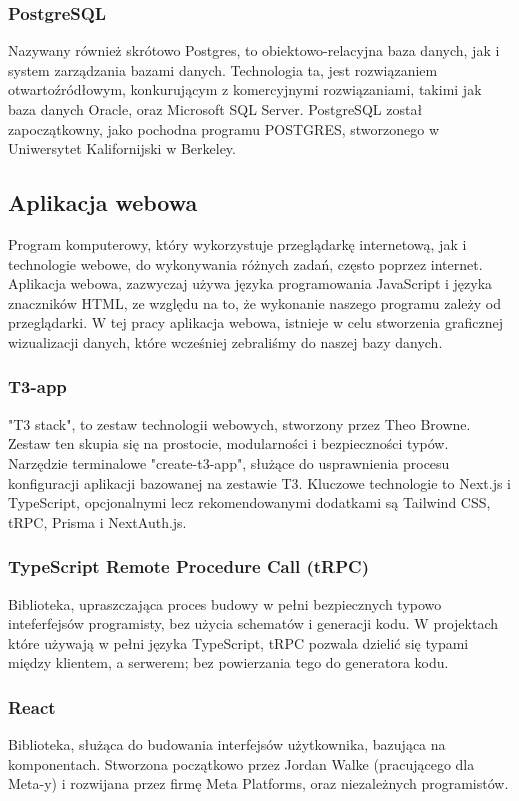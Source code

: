 \documentclass[a4paper, 12pt]{article}
\begin{document}
\subsubsection{PostgreSQL}
Nazywany również skrótowo Postgres, to obiektowo-relacyjna baza danych, jak i system zarządzania bazami danych. Technologia ta, jest rozwiązaniem otwartoźródłowym, konkurującym z komercyjnymi rozwiązaniami, takimi jak baza danych Oracle, oraz Microsoft SQL Server.\cite{postgresWhatis} PostgreSQL został zapoczątkowny, jako pochodna programu POSTGRES, stworzonego w Uniwersytet Kalifornijski w Berkeley.\cite{postgresHistory}
\subsection{Aplikacja webowa}
Program komputerowy, który wykorzystuje przeglądarkę internetową, jak i technologie webowe, do wykonywania różnych zadań, często poprzez internet. Aplikacja webowa, zazwyczaj używa języka programowania JavaScript i języka znaczników HTML, ze względu na to, że wykonanie naszego programu zależy od przeglądarki.\cite{stackpathWebapp} W tej pracy aplikacja webowa, istnieje w celu stworzenia graficznej wizualizacji danych, które wcześniej zebraliśmy do naszej bazy danych.
\subsubsection{T3-app}
"T3 stack", to zestaw technologii webowych, stworzony przez Theo Browne. Zestaw ten skupia się na prostocie, modularności i bezpieczności typów. Narzędzie terminalowe "create-t3-app", służące do usprawnienia procesu konfiguracji aplikacji bazowanej na zestawie T3. Kluczowe technologie to Next.js i TypeScript, opcjonalnymi lecz rekomendowanymi dodatkami są Tailwind CSS, tRPC, Prisma i NextAuth.js.\cite{introT3}
\subsubsection{TypeScript Remote Procedure Call (tRPC)}
Biblioteka, upraszczająca proces budowy w pełni bezpiecznych typowo inteferfejsów programisty, bez użycia schematów i generacji kodu. W projektach które używają w pełni języka TypeScript, tRPC pozwala dzielić się typami między klientem, a serwerem; bez powierzania tego do generatora kodu.\cite{introTRPC}
\subsubsection{React}
Biblioteka, służąca do budowania interfejsów użytkownika, bazująca na komponentach. Stworzona początkowo przez Jordan Walke (pracującego dla Meta-y) i rozwijana przez firmę Meta Platforms, oraz niezależnych programistów.\cite{quickstartReact}\cite{honeypotReact}
\end{document}
